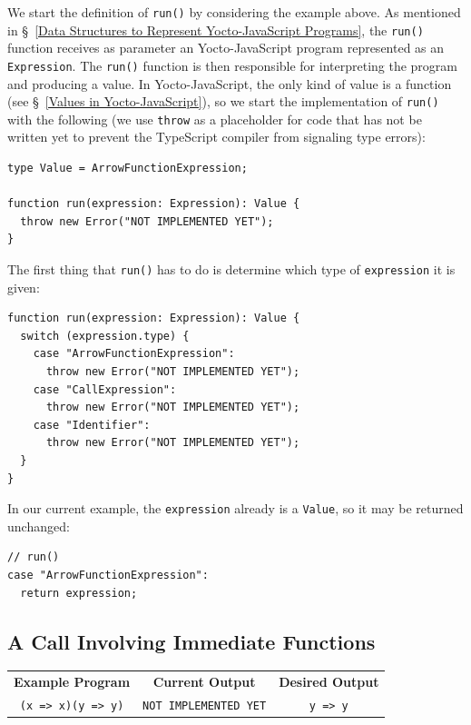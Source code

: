 \documentclass[12pt, oneside]{book}
\begin{document}
We start the definition of \texttt{run()} by considering the example above. As mentioned in §~\ref{Data Structures to Represent Yocto-JavaScript Programs}, the \texttt{run()} function receives as parameter an Yocto-JavaScript program represented as an \texttt{Expression}. The \texttt{run()} function is then responsible for interpreting the program and producing a value. In Yocto-JavaScript, the only kind of value is a function (see §~\ref{Values in Yocto-JavaScript}), so we start the implementation of \texttt{run()} with the following (we use \texttt{throw} as a placeholder for code that has not be written yet to prevent the TypeScript compiler from signaling type errors):

\begin{verbatim}
type Value = ArrowFunctionExpression;

function run(expression: Expression): Value {
  throw new Error("NOT IMPLEMENTED YET");
}
\end{verbatim}

The first thing that \texttt{run()} has to do is determine which type of \texttt{expression} it is given:

\begin{verbatim}
function run(expression: Expression): Value {
  switch (expression.type) {
    case "ArrowFunctionExpression":
      throw new Error("NOT IMPLEMENTED YET");
    case "CallExpression":
      throw new Error("NOT IMPLEMENTED YET");
    case "Identifier":
      throw new Error("NOT IMPLEMENTED YET");
  }
}
\end{verbatim}

In our current example, the \texttt{expression} already is a \texttt{Value}, so it may be returned unchanged:

\begin{verbatim}
// run()
case "ArrowFunctionExpression":
  return expression;
\end{verbatim}

\subsection{A Call Involving Immediate Functions}
\label{A Call Involving Immediate Functions}

\begin{center}
\begin{tabular}{c|c|c}
\textbf{Example Program} & \textbf{Current Output} & \textbf{Desired Output} \\
\texttt{(x => x)(y => y)} & \texttt{NOT IMPLEMENTED YET} & \texttt{y => y} \\
\end{tabular}
\end{center}
\end{document}
